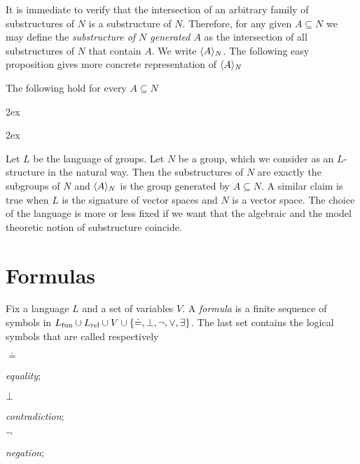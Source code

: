 It is immediate to verify that the intersection of an arbitrary family of substructures of $N$ is a substructure of $N$. Therefore, for any given $A\subseteq N$ we may define the \emph{substructure of $N$ generated $A$\/} as the intersection of all substructures of $N$ that contain $A$. We write \emph{$\langle A\rangle_N$}. The following easy proposition gives more concrete representation of $\langle A\rangle_N$
%
\begin{lemma}\label{strutturagenerata}
The following hold for every $A\subseteq N$



\kern2ex

\kern2ex\QED

\begin{example}
Let $L$ be the language of groups. Let $N$ be a group, which we consider as an $L$-structure in the natural way. Then the substructures of $N$ are exactly the subgroups of $N$ and $\langle A\rangle_N$ is the group generated by $A\subseteq N$. A similar claim is true when $L$ is the signature of vector spaces and $N$ is a vector space. The choice of the language is more or less fixed if we want that the algebraic and the model theoretic notion of substructure coincide.\QED
\end{example}
\end{lemma}


\section{Formulas}\label{sintassformule}


Fix a language $L$ and a set of variables $V$. A \emph{formula} is a finite sequence of symbols in $L_{\rm fun}\cup L_{\rm rel}\cup V\cup \{\doteq,\bot,\neg,\vee,\exists\}$. The last set contains the logical symbols that are called respectively


\def\medrel#1{\parbox[t]{4ex}{#1}}
\def\ceq#1#2{\medrel{#1}{\parbox{25ex}{#2}}}


\ceq{$\doteq$}{\emph{equality};}\ceq{$\bot$}{\emph{contradiction};}\ceq{$\neg$}{\emph{negation};}


